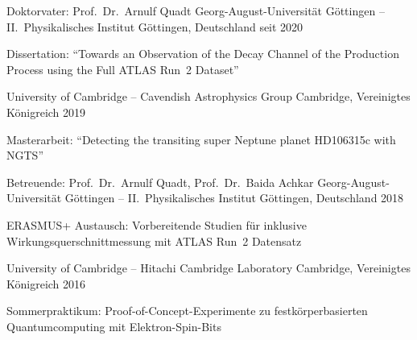 %
\begin{cventries}%
  \cventry%
    {Doktorvater: Prof.\ Dr.\ Arnulf Quadt} %
    {Georg-August-Universit\"at G\"ottingen -- II.\ Physikalisches Institut} %
    {G\"ottingen, Deutschland} %
    {seit 2020} %
    {%
      \begin{cvitems} %
        \item {%
          Dissertation:%
          ``Towards an Observation of the \Hbb Decay Channel of the \ttH Production Process using the Full\newline%
          ATLAS Run~2 Dataset''%
        }%
      \end{cvitems}%
    }%

    {University of Cambridge -- Cavendish Astrophysics Group} %
    {Cambridge, Vereinigtes K\"onigreich} %
    {2019} %
    {%
      \begin{cvitems} %
        \item {Masterarbeit: ``Detecting the transiting super Neptune planet HD106315c with NGTS''}%
      \end{cvitems}%
    }%

  \cventry%
    {Betreuende: Prof.\ Dr.\ Arnulf Quadt, Prof.\ Dr.\ Baida Achkar} %
    {Georg-August-Universit\"at G\"ottingen -- II.\ Physikalisches Institut} %
    {G\"ottingen, Deutschland} %
    {2018} %
    {%
      \begin{cvitems} %
        \item {ERASMUS+ Austausch: Vorbereitende Studien f\"ur inklusive \ttbar Wirkungsquerschnittmessung mit ATLAS Run~2 Datensatz}%
      \end{cvitems}%
    }%

    {University of Cambridge -- Hitachi Cambridge Laboratory} %
    {Cambridge, Vereinigtes K\"onigreich} %
    {2016} %
    {%
      \begin{cvitems} %
        \item {Sommerpraktikum: Proof-of-Concept-Experimente zu festk\"orperbasierten Quantumcomputing mit Elektron-Spin-Bits}%
      \end{cvitems}%
    }%
\end{cventries}%
